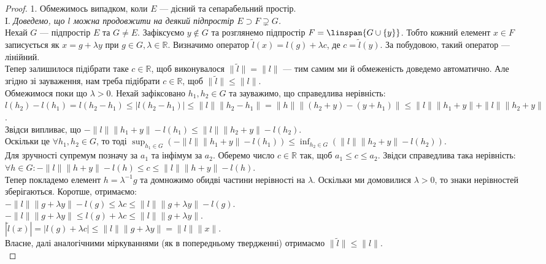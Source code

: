 \documentclass{math_library}
\begin{document}
\iffalse
\begin{proof}
1. Обмежимось випадком, коли $E$ --- дісний та сепарабельний простір.\\
I. \textit{Доведемо, що $l$ можна продовжити на деякий підпростір $E \supset F \supsetneq G$.}\\
Нехай $G$ --- підпростір $E$ та $G \neq E$. Зафіксуємо $y \notin G$ та розглянемо підпростір $F = \linspan\{G \cup \{y\}\}$. Тобто кожний елемент $x \in F$ записується як $x = g + \lambda y$ при $g \in G, \lambda \in \mathbb{R}$. Визначимо оператор $\tilde{l}(x) = l(g) + \lambda c$, де $c = \tilde{l}(y)$. За побудовою, такий оператор --- лінійний.\\
Тепер залишилося підібрати таке $c \in \mathbb{R}$, щоб виконувалося $\|\tilde{l}\| = \|l\|$ --- тим самим ми й обмеженість доведемо автоматично. Але згідно зі зауваження, нам треба підібрати $c \in \mathbb{R}$, щоб $\|\tilde{l}\| \leq \|l\|$.\\
Обмежимося поки що $\lambda > 0$. Нехай зафіксовано $h_1,h_2 \in G$ та зауважимо, що справедлива нерівність:\\
$l(h_2) - l(h_1) = l(h_2-h_1) \leq |l(h_2-h_1)| \leq \|l\| \|h_2 - h_1\| = \|h \| \|(h_2+y) - (y+h_1)\| \leq \|l\| \|h_1+y\| + \|l\| \|h_2+y\|$.\\
Звідси випливає, що $-\|l\| \|h_1+y\| - l(h_1) \leq \|l\| \|h_2+y\| - l(h_2)$.\\
Оскільки це $\forall h_1,h_2 \in G$, то тоді $\displaystyle\sup_{h_1 \in G} (-\|l\| \|h_1+y\| - l(h_1)) \leq \inf_{h_2 \in G} ( \|l\| \|h_2+y\| - l(h_2))$.\\
Для зручності супремум позначу за $a_1$ та інфімум за $a_2$. Оберемо число $c \in \mathbb{R}$ так, щоб $a_1 \leq c \leq a_2$. Звідси справедлива така нерівність:\\
$\forall h \in G: -\|l\| \|h+y\| - l(h) \leq c \leq \|l\| \|h+y\| - l(h)$.\\
Тепер покладемо елемент $h = \lambda^{-1}g$ та домножимо обидві частини нерівності на $\lambda$. Оскільки ми домовилися $\lambda > 0$, то знаки нерівностей зберігаються. Коротше, отримаємо:\\
$-\|l\| \|g+\lambda y \| - l(g) \leq \lambda c \leq \|l\| \|g + \lambda y \| - l(g)$.\\
$-\|l\| \|g+\lambda y\| \leq l(g) + \lambda c \leq \|l\| \|g+\lambda y\|$.\\
$|\tilde{l}(x)| = |l(g) + \lambda c| \leq \|l\| \|g + \lambda y\| = \|l\| \|x\|$.\\
Власне, далі аналогічними міркуваннями (як в попередньому твердженні) отримаємо $\|\tilde{l}\| \leq \|l\|$.\\

\end{proof}
\end{document}
